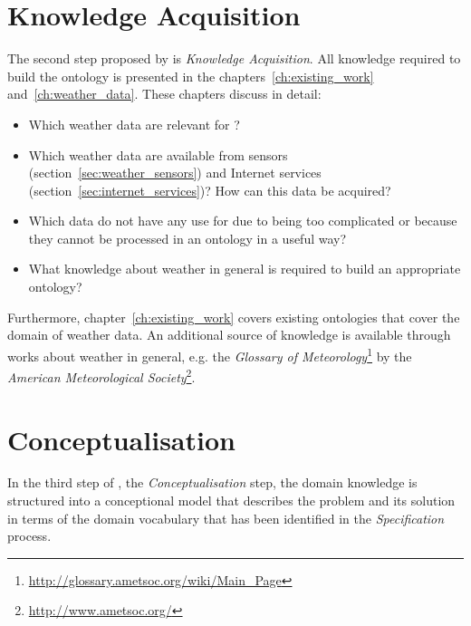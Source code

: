 \section{Knowledge Acquisition}

The second step proposed by \methontology is \emph{Knowledge Acquisition}. All knowledge required to build the \thinkhomeweather ontology is presented in the chapters~\ref{ch:existing_work} and~\ref{ch:weather_data}. These chapters discuss in detail:

\begin{itemize}
  \item Which weather data are relevant for \thinkhome?
  \item Which weather data are available from sensors (section~\ref{sec:weather_sensors}) and Internet services (section~\ref{sec:internet_services})? How can this data be acquired?
  \item Which data do not have any use for \thinkhomeweather due to being too complicated or because they cannot be processed in an ontology in a useful way?
  \item What knowledge about weather in general is required to build an appropriate ontology? %
\end{itemize}

Furthermore, chapter~\ref{ch:existing_work} covers existing ontologies that cover the domain of weather data. An additional source of knowledge is available through works about weather in general, e.g. the \emph{Glossary of Meteorology}\footnote{\href{http://glossary.ametsoc.org/wiki/Main\_Page}{http://glossary.ametsoc.org/wiki/Main\_Page}} by the \emph{American Meteorological Society}\footnote{\href{http://www.ametsoc.org/}{http://www.ametsoc.org/}}\cite{GlossaryOfMeteorology}.

\section{Conceptualisation}

In the third step of \methontology, the \emph{Conceptualisation} step, the domain knowledge is structured into a conceptional model that describes the problem and its solution in terms of the domain vocabulary that has been identified in the \emph{Specification} process.

